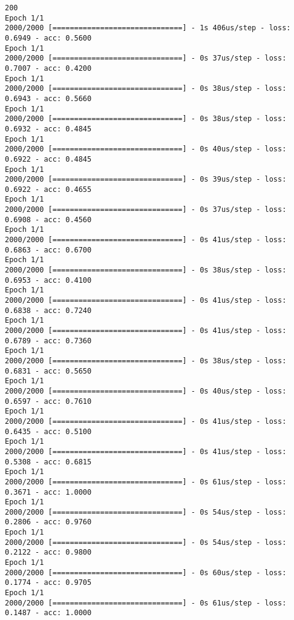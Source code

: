 \documentclass[11pt]{article}
\begin{document}
    \begin{Verbatim}[commandchars=\\\{\}]
200
Epoch 1/1
2000/2000 [==============================] - 1s 406us/step - loss: 0.6949 - acc: 0.5600
Epoch 1/1
2000/2000 [==============================] - 0s 37us/step - loss: 0.7007 - acc: 0.4200
Epoch 1/1
2000/2000 [==============================] - 0s 38us/step - loss: 0.6943 - acc: 0.5660
Epoch 1/1
2000/2000 [==============================] - 0s 38us/step - loss: 0.6932 - acc: 0.4845
Epoch 1/1
2000/2000 [==============================] - 0s 40us/step - loss: 0.6922 - acc: 0.4845
Epoch 1/1
2000/2000 [==============================] - 0s 39us/step - loss: 0.6922 - acc: 0.4655
Epoch 1/1
2000/2000 [==============================] - 0s 37us/step - loss: 0.6908 - acc: 0.4560
Epoch 1/1
2000/2000 [==============================] - 0s 41us/step - loss: 0.6863 - acc: 0.6700
Epoch 1/1
2000/2000 [==============================] - 0s 38us/step - loss: 0.6953 - acc: 0.4100
Epoch 1/1
2000/2000 [==============================] - 0s 41us/step - loss: 0.6838 - acc: 0.7240
Epoch 1/1
2000/2000 [==============================] - 0s 41us/step - loss: 0.6789 - acc: 0.7360
Epoch 1/1
2000/2000 [==============================] - 0s 38us/step - loss: 0.6831 - acc: 0.5650
Epoch 1/1
2000/2000 [==============================] - 0s 40us/step - loss: 0.6597 - acc: 0.7610
Epoch 1/1
2000/2000 [==============================] - 0s 41us/step - loss: 0.6435 - acc: 0.5100
Epoch 1/1
2000/2000 [==============================] - 0s 41us/step - loss: 0.5308 - acc: 0.6815
Epoch 1/1
2000/2000 [==============================] - 0s 61us/step - loss: 0.3671 - acc: 1.0000
Epoch 1/1
2000/2000 [==============================] - 0s 54us/step - loss: 0.2806 - acc: 0.9760
Epoch 1/1
2000/2000 [==============================] - 0s 54us/step - loss: 0.2122 - acc: 0.9800
Epoch 1/1
2000/2000 [==============================] - 0s 60us/step - loss: 0.1774 - acc: 0.9705
Epoch 1/1
2000/2000 [==============================] - 0s 61us/step - loss: 0.1487 - acc: 1.0000

    \end{Verbatim}
\end{document}
